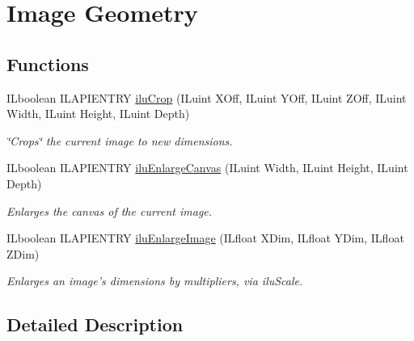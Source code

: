 \hypertarget{group__geometry}{\section{Image Geometry}
\label{group__geometry}
}
\subsection*{Functions}
\begin{DoxyCompactItemize}
\item 
I\-Lboolean I\-L\-A\-P\-I\-E\-N\-T\-R\-Y \hyperlink{group__geometry_ga80e4330e84ad8ec34c701e9b72c1ffed}{ilu\-Crop} (I\-Luint X\-Off, I\-Luint Y\-Off, I\-Luint Z\-Off, I\-Luint Width, I\-Luint Height, I\-Luint Depth)
\begin{DoxyCompactList}\small\item\em \char`\"{}\-Crops\char`\"{} the current image to new dimensions. \end{DoxyCompactList}\item 
I\-Lboolean I\-L\-A\-P\-I\-E\-N\-T\-R\-Y \hyperlink{group__geometry_gacba148d63e2e0da80b100c3ada950cb4}{ilu\-Enlarge\-Canvas} (I\-Luint Width, I\-Luint Height, I\-Luint Depth)
\begin{DoxyCompactList}\small\item\em Enlarges the canvas of the current image. \end{DoxyCompactList}\item 
I\-Lboolean I\-L\-A\-P\-I\-E\-N\-T\-R\-Y \hyperlink{group__geometry_gaa9fe272b82b15ed2e52762e5e763b908}{ilu\-Enlarge\-Image} (I\-Lfloat X\-Dim, I\-Lfloat Y\-Dim, I\-Lfloat Z\-Dim)
\begin{DoxyCompactList}\small\item\em Enlarges an image's dimensions by multipliers, via ilu\-Scale. \end{DoxyCompactList}\end{DoxyCompactItemize}


\subsection{Detailed Description}


